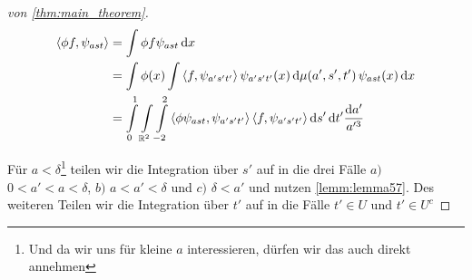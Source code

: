 \begin{proof}[von \ref{thm:main_theorem}]
\begin{align*}
    \left\langle \phi f, \psi_{ast} \right\rangle
    &=
    \int \phi f \psi_{ast} \mathop{}\!\mathrm{d} x
    \\&=
    \int \phi(x) \int \left\langle f, \psi_{a' s' t'} \right\rangle
    \psi_{a's't'} (x) \mathop{}\!\mathrm{d} \mu(a',s',t') \,\psi_{ast}(x) \mathop{}\!\mathrm{d} x
    \\&=
    \int\limits_{0}^{1} \int\limits_{\mathbb{R}^2} \int\limits_{-2}^2
    \left\langle \phi \psi_{ast}, \psi_{a's't'} \right\rangle
    \left\langle f, \psi_{a's't'} \right\rangle
    \mathop{}\!\mathrm{d} s' \mathop{}\!\mathrm{d} t' \frac{\mathop{}\!\mathrm{d} a'}{a^{\prime 3}}
\end{align*}


Für $a < \delta$\footnote{Und da wir uns für kleine $a$ interessieren, dürfen wir das auch direkt annehmen} teilen wir die Integration über $s'$ auf in die drei Fälle $a)$ $0<a'<a<\delta$, $b)$ $a < a' < \delta$ und $c)$ $\delta < a'$ und nutzen \cref{lemm:lemma57}. Des weiteren Teilen wir die Integration über $t'$ auf in die Fälle $t' \in U$ und $t' \in U^c$


\end{proof}
